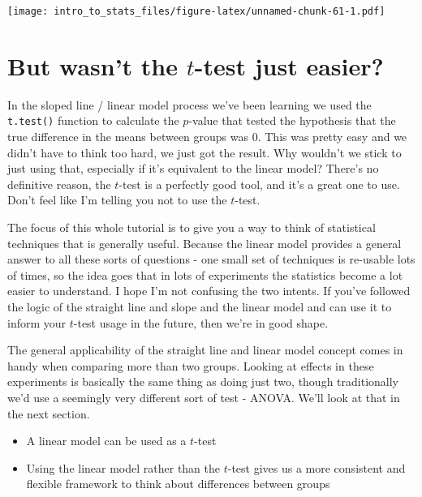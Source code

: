 \documentclass[
]{book}
\providecommand{\tightlist}{%
  \setlength{\itemsep}{0pt}\setlength{\parskip}{0pt}}
\newenvironment{roundup}
{ \begin{tcolorbox}[colbacktitle=yellow!50!white,
title=Round Up,coltitle=black,
fonttitle=\bfseries] }
{  \end{tcolorbox} }
\begin{document}
\texttt{[image: intro\_to\_stats\_files/figure-latex/unnamed-chunk-61-1.pdf]}

\hypertarget{but-wasnt-the-t-test-just-easier}{%
\section{\texorpdfstring{But wasn't the \(t\)-test just easier?}{But wasn't the t-test just easier?}}\label{but-wasnt-the-t-test-just-easier}}

In the sloped line / linear model process we've been learning we used the \texttt{t.test()} function to calculate the \(p\)-value that tested the hypothesis that the true difference in the means between groups was 0. This was pretty easy and we didn't have to think too hard, we just got the result. Why wouldn't we stick to just using that, especially if it's equivalent to the linear model? There's no definitive reason, the \(t\)-test is a perfectly good tool, and it's a great one to use. Don't feel like I'm telling you not to use the \(t\)-test.

The focus of this whole tutorial is to give you a way to think of statistical techniques that is generally useful. Because the linear model provides a general answer to all these sorts of questions - one small set of techniques is re-usable lots of times, so the idea goes that in lots of experiments the statistics become a lot easier to understand. I hope I'm not confusing the two intents. If you've followed the logic of the straight line and slope and the linear model and can use it to inform your \(t\)-test usage in the future, then we're in good shape.

The general applicability of the straight line and linear model concept comes in handy when comparing more than two groups. Looking at effects in these experiments is basically the same thing as doing just two, though traditionally we'd use a seemingly very different sort of test - ANOVA. We'll look at that in the next section.

\begin{roundup}
\begin{itemize}
\tightlist
\item
  A linear model can be used as a \(t\)-test
\item
  Using the linear model rather than the \(t\)-test gives us a more consistent and flexible framework to think about differences between groups
\end{itemize}
\end{roundup}
\end{document}
